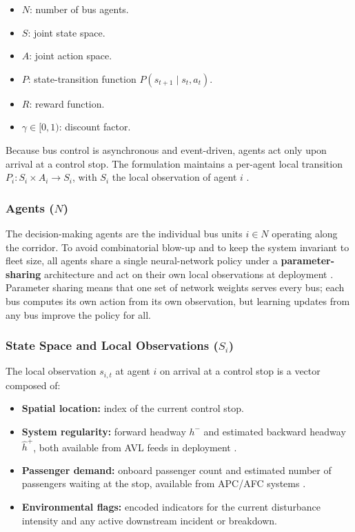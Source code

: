 \begin{itemize}
\item $N$: number of bus agents.
\item $S$: joint state space.
\item $A$: joint action space.
\item $P$: state-transition function $P(s_{t+1}\mid s_t, a_t)$.
\item $R$: reward function.
\item $\gamma \in [0, 1)$: discount factor.
\end{itemize}

Because bus control is asynchronous and event-driven, agents act only upon arrival at a control stop. The formulation maintains a per-agent local transition $P_i : S_i \times A_i \rightarrow S_i$, with $S_i$ the local observation of agent $i$ \cite{Wangsun,Rodriguez2023Cooperative}.

\subsubsection{Agents ($N$)}

The decision-making agents are the individual bus units $i \in N$ operating along the corridor. To avoid combinatorial blow-up and to keep the system invariant to fleet size, all agents share a single neural-network policy under a \textbf{parameter-sharing} architecture and act on their own local observations at deployment \cite{Wangsun,Rodriguez2023Cooperative,Christianos2021PS}. Parameter sharing means that one set of network weights serves every bus; each bus computes its own action from its own observation, but learning updates from any bus improve the policy for all.

\subsubsection{State Space and Local Observations ($S_i$)}
\label{subsec:state-space}

The local observation $s_{i,t}$ at agent $i$ on arrival at a control stop is a vector composed of:

\begin{itemize}
\item \textbf{Spatial location:} index of the current control stop.
\item \textbf{System regularity:} forward headway $h^-$ and estimated backward headway $\hat{h}^+$, both available from AVL feeds in deployment \cite{Wangsun}.
\item \textbf{Passenger demand:} onboard passenger count and estimated number of passengers waiting at the stop, available from APC/AFC systems \cite{Wangsun}.
\item \textbf{Environmental flags:} encoded indicators for the current disturbance intensity and any active downstream incident or breakdown.
\end{itemize}

